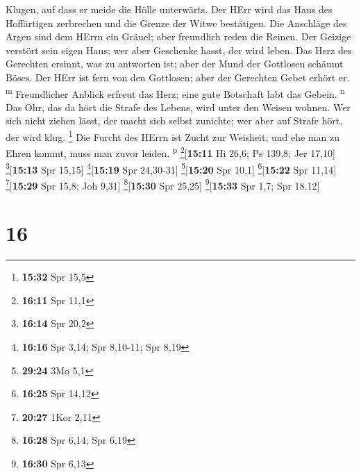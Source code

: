 Klugen, auf dass er meide die Hölle unterwärts.  Der HErr
wird das Haus des Hoffärtigen zerbrechen und die Grenze der Witwe
bestätigen.  Die Anschläge des Argen sind dem HErrn ein
Gräuel; aber freundlich reden die Reinen.  Der Geizige
verstört sein eigen Haus; wer aber Geschenke hasst, der wird leben.
 Das Herz des Gerechten ersinnt, was zu antworten ist;
aber der Mund der Gottlosen schäumt Böses.  Der HErr ist
fern von den Gottlosen; aber der Gerechten Gebet erhört er.
\textsuperscript{m}  Freundlicher Anblick erfreut das
Herz; eine gute Botschaft labt das Gebein. \textsuperscript{n}
 Das Ohr, das da hört die Strafe des Lebens, wird unter
den Weisen wohnen.  Wer sich nicht ziehen lässt, der
macht sich selbst zunichte; wer aber auf Strafe hört, der wird klug.
\footnote{\textbf{15:32} Spr 15,5}  Die Furcht des HErrn
ist Zucht zur Weisheit; und ehe man zu Ehren kommt, muss man zuvor
leiden. \textsuperscript{p} \footnote{\textbf{16:11} Spr 11,1}{[}\textbf{15:11}
Hi 26,6; Ps 139,8; Jer 17,10{]} \footnote{\textbf{16:14} Spr 20,2}{[}\textbf{15:13}
Spr 15,15{]} \footnote{\textbf{16:16} Spr 3,14; Spr 8,10-11; Spr 8,19}{[}\textbf{15:19}
Spr 24,30-31{]} \footnote{\textbf{29:24} 3Mo 5,1}{[}\textbf{15:20} Spr
10,1{]} \footnote{\textbf{16:25} Spr 14,12}{[}\textbf{15:22} Spr
11,14{]} \footnote{\textbf{20:27} 1Kor 2,11}{[}\textbf{15:29} Spr 15,8;
Joh 9,31{]} \footnote{\textbf{16:28} Spr 6,14; Spr 6,19}{[}\textbf{15:30}
Spr 25,25{]} \footnote{\textbf{16:30} Spr 6,13}{[}\textbf{15:33} Spr
1,7; Spr 18,12{]}

\hypertarget{section-15}{%
\section{16}\label{section-15}}

